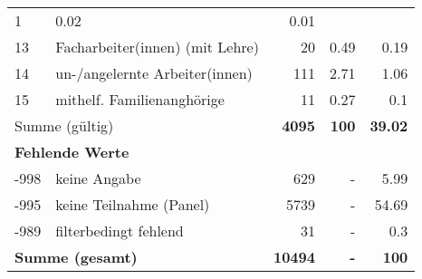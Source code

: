 \begin{longtable}{lXrrr}
       \num{1} &
       \num[round-mode=places,round-precision=2]{0.02} &
         \num[round-mode=places,round-precision=2]{0.01} \\

     13 &
     \multicolumn{1}{X}{ Facharbeiter(innen) (mit Lehre)   } &


       \num{20} &
       \num[round-mode=places,round-precision=2]{0.49} &
         \num[round-mode=places,round-precision=2]{0.19} \\

     14 &
     \multicolumn{1}{X}{ un-/angelernte Arbeiter(innen)   } &


       \num{111} &
       \num[round-mode=places,round-precision=2]{2.71} &
         \num[round-mode=places,round-precision=2]{1.06} \\

     15 &
     \multicolumn{1}{X}{ mithelf. Familienanghörige   } &


       \num{11} &
       \num[round-mode=places,round-precision=2]{0.27} &
         \num[round-mode=places,round-precision=2]{0.1} \\
     \midrule
     \multicolumn{2}{l}{Summe (gültig)} &
       \textbf{\num{4095}} &
     \textbf{\num{100}} &
       \textbf{\num[round-mode=places,round-precision=2]{39.02}} \\
     \multicolumn{5}{l}{\textbf{Fehlende Werte}}\\
       -998 &
       keine Angabe &
         \num{629} &
        - &
         \num[round-mode=places,round-precision=2]{5.99} \\
       -995 &
       keine Teilnahme (Panel) &
         \num{5739} &
        - &
         \num[round-mode=places,round-precision=2]{54.69} \\
       -989 &
       filterbedingt fehlend &
         \num{31} &
        - &
         \num[round-mode=places,round-precision=2]{0.3} \\
     \midrule
     \multicolumn{2}{l}{\textbf{Summe (gesamt)}} &
          \textbf{\num{10494}} &
        \textbf{-} &
        \textbf{\num{100}} \\
     \bottomrule
     \end{longtable}
     
